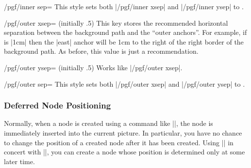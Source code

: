 \begin{key}{/pgf/inner sep=}
    This style sets both |/pgf/inner xsep| and |/pgf/inner ysep| to
    .
\end{key}

\begin{key}{/pgf/outer xsep= (initially .5\string\pgflinewidth)}
    This key stores the recommended horizontal separation between the
    background path and the ``outer anchors''. For example, if 
    is |1cm| then the |east| anchor will be 1cm to the right of the right
    border of the background path. As before, this value is just a
    recommendation.
\begin{codeexample}[]
\end{codeexample}
\end{key}

\begin{key}{/pgf/outer ysep= (initially .5\string\pgflinewidth)}
    Works like |/pgf/outer xsep|.
\end{key}

\begin{key}{/pgf/outer sep=}
    This style sets both |/pgf/outer xsep| and |/pgf/outer ysep| to
    .
\end{key}


\subsubsection{Deferred Node Positioning}
\label{section-shapes-deferred-node-positioning}

Normally, when a node is created using a command like |\pgfnode|, the node is
immediately inserted into the current picture. In particular, you have no
chance to change the position of a created node after it has been created.
Using |\pgfpositionnodelater| in concert with |\pgfpositionnodenow|, you can
create a node whose position is determined only at some later time.

